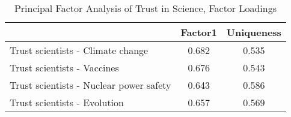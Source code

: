 \begin{table}[htbp]\centering
\def\sym#1{\ifmmode^{#1}\else\(^{#1}\)\fi}
\caption{Principal Factor Analysis of Trust in Science, Factor Loadings}
\begin{tabular}{l*{1}{cc}}
\hline\hline
                    &     Factor1&  Uniqueness\\
\hline
Trust scientists - Climate change&       0.682&       0.535\\
Trust scientists - Vaccines&       0.676&       0.543\\
Trust scientists -  Nuclear power safety&       0.643&       0.586\\
Trust scientists - Evolution&       0.657&       0.569\\
\hline\hline
\end{tabular}
\end{table}
